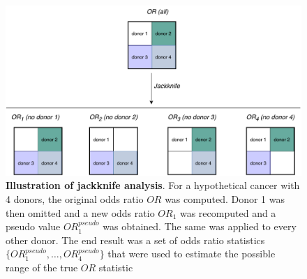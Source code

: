 \begin{figure}[ht!]
    \centering
    \includegraphics[scale=0.8]{graphics/jackknife_demo.pdf}
    \caption{\textbf{Illustration of jackknife analysis}. For a hypothetical cancer with 4 donors, the original odds ratio $OR$ was computed. Donor 1 was then omitted and a new odds ratio $OR_1$ was recomputed and a pseudo value $OR^{pseudo}_1$ was obtained. The same was applied to every other donor. The end result was a set of odds ratio statistics $\{OR_1^{pseudo}, \ldots, OR_4^{pseudo}\}$ that were used to estimate the possible range of the true $OR$ statistic}
    \label{fig:jackknife_demo}
\end{figure}
